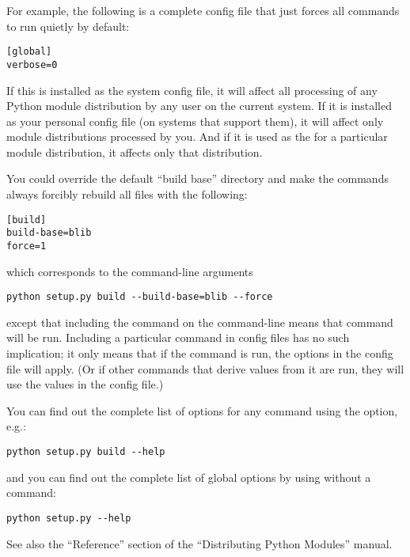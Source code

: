 \documentclass{howto}
\begin{document}
For example, the following is a complete config file that just forces
all commands to run quietly by default:

\begin{verbatim}
[global]
verbose=0
\end{verbatim}

If this is installed as the system config file, it will affect all
processing of any Python module distribution by any user on the current
system.  If it is installed as your personal config file (on systems
that support them), it will affect only module distributions processed
by you.  And if it is used as the  for a particular
module distribution, it affects only that distribution.

You could override the default ``build base'' directory and make the
 commands always forcibly rebuild all files with the
following:

\begin{verbatim}
[build]
build-base=blib
force=1
\end{verbatim}

which corresponds to the command-line arguments

\begin{verbatim}
python setup.py build --build-base=blib --force
\end{verbatim}

except that including the  command on the command-line
means that command will be run.  Including a particular command in
config files has no such implication; it only means that if the command
is run, the options in the config file will apply.  (Or if other
commands that derive values from it are run, they will use the values in
the config file.)

You can find out the complete list of options for any command using the
 option, e.g.:

\begin{verbatim}
python setup.py build --help
\end{verbatim}

and you can find out the complete list of global options by using
 without a command:

\begin{verbatim}
python setup.py --help
\end{verbatim}

See also the ``Reference'' section of the ``Distributing Python
Modules'' manual.






\end{document}

